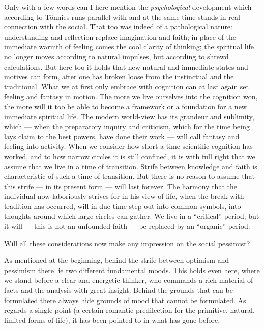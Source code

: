 \documentclass[12pt,a4paper,openany]{book}
\newcommand{\opage}[1]{\marginnote{\footnotesize\textit{[#1]}}}
\begin{document}
Only with a few words can I here mention the
\emph{psychological} development which according to Tönnies runs parallel with and
at the same time stands in real connection with the social. That too
was indeed of a pathological nature: understanding and reflection
replace imagination and faith; in place of the immediate
warmth of feeling comes the cool clarity of thinking; the
spiritual life no longer moves according to natural impulses,
but according to shrewd calculations. But here too it holds that
\opage{156}new natural and immediate states and motives can
form, after one has broken loose from the instinctual
and the traditional. What we at first only embrace with cognition
can at last again set feeling and fantasy in motion. The
more we live ourselves into the cognition won, the more
will it too be able to become a framework or a foundation for a new
immediate spiritual life. The modern world-view
has its grandeur and sublimity, which --- when the preparatory
inquiry and criticism, which for the time being lays claim to the best
powers, have done their work --- will call fantasy and feeling
into activity. When we consider how short a time scientific
cognition has worked, and to how narrow circles it is still
confined, it is with full right that we assume that we live
in a time of transition. Strife between knowledge and faith is characteristic
of such a time of transition. But there is no reason to
assume that this strife --- in its present form --- will last
forever. The harmony that the individual now laboriously
strives for in his view of life, when the break with tradition
has occurred, will in due time step out into common symbols, into thoughts
around which large circles can gather. We live in a ``critical''
period; but it will --- this is not an unfounded faith ---
be replaced by an ``organic'' period. ---

Will all these considerations now make any impression on
the social pessimist?

As mentioned at the beginning, behind the strife between
optimism and pessimism there lie two different fundamental moods. This
holds even here, where we stand before a clear and energetic
thinker, who commands a rich material of facts
and the analysis with great insight. Behind the grounds that
can be formulated there always hide grounds of mood
that cannot be formulated. As regards a single point
(a certain romantic predilection for the primitive, natural,
limited forms of life), it has been pointed to in what has gone before.
\end{document}
